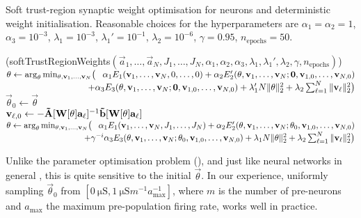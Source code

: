 \begin{algorithm}[t]
	\begin{minipage}{0.98\textwidth}
	\caption[Soft trust-region synaptic weight optimisation for $n$-LIF neurons]{Soft trust-region synaptic weight optimisation for \nlif neurons and deterministic weight initialisation.
	Reasonable choices for the hyperparameters are
	$\alpha_1 = \alpha_2 = 1$, $\alpha_3 = 10^{-3}$, $\lambda_1 = 10^{-3}$, $\lambda_1' = 10^{-1}$, $\lambda_2 = 10^{-6}$, $\gamma = 0.95$, $n_\mathrm{epochs} = 50$.
	}
	\label{alg:nlif_tr_weights}
	\end{minipage}
	\sffamily\small
	\Begin(softTrustRegionWeights${(\vec a_1, \ldots, \vec a_N, J_1, \ldots, J_N, \alpha_1, \alpha_2, \alpha_3, \lambda_1, \lambda_1', \lambda_2, \gamma, n_\mathrm{epochs})}$)
	{
		$\vec \theta \gets
			\arg_{\vec \theta}\min_{\vec \theta, \vec v_1, \ldots, \vec v_N}
				\bigl( \hphantom{+} \alpha_1 E_1(\vec v_1, \ldots, \vec v_{N}, 0, \ldots, 0)
			+ \alpha_2 E_2'(\vec \theta, \vec v_1, \ldots, \vec v_N; \vec 0, \vec v_{1,0}, \ldots, \vec v_{N, 0})$ \\
		$\hspace{9.15em} + \alpha_3 E_3(\vec \theta, \vec v_1, \ldots, \vec v_N; \vec 0, \vec v_{1,0}, \ldots, \vec v_{N, 0}) + \lambda'_1 N \|\vec \theta\|_2^2 + \lambda_2 \sum_{\ell = 1}^N \| \vec v_{\ell} \|_2^2 \bigr)$ \\
		{
			$\vec \theta_0 \gets \vec \theta$ \\
			{
				$\vec v_{\ell, 0} \gets -\mrA[\mat W[\vec \theta] \vec a_\ell]^{-1} \vrb[\mat W[\vec \theta] \vec a_\ell]$
			}
			$\vec \theta \gets
				\arg_{\vec \theta}\min_{\vec \theta, \vec v_1, \ldots, \vec v_N}
					\bigl( \hphantom{+} \alpha_1 E_1(\vec v_1, \ldots, \vec v_{N}, J_1, \ldots, J_N)
				+ \alpha_2 E_2'(\vec \theta, \vec v_1, \ldots, \vec v_N; \vec \theta_0, \vec v_{1,0}, \ldots, \vec v_{N, 0})$ \\
			$\hspace{9.15em} + \gamma^{-i} \alpha_3 E_3(\vec \theta, \vec v_1, \ldots, \vec v_N; \vec \theta_0, \vec v_{1,0}, \ldots, \vec v_{N, 0}) + \lambda_1 N \|\vec \theta\|_2^2 + \lambda_2 \sum_{\ell = 1}^N \| \vec v_{\ell} \|_2^2 \bigr)$
		}
		\Return{$\vec \theta$}
	}
\end{algorithm}


Unlike the parameter optimisation problem (), and just like neural networks in general \citep[cf.~][]{sutskever2013importance,he2015delving}, this \SQP is quite sensitive to the initial $\vec \theta$.
In our experience, uniformly sampling $\vec \theta_0$ from $[\SI{0}{\micro\siemens}, \SI{1}{\micro\siemens} m^{-1} a_\mathrm{max}^{-1}]$, where $m$ is the number of pre-neurons and $a_\mathrm{max}$ the maximum pre-population firing rate, works well in practice.

